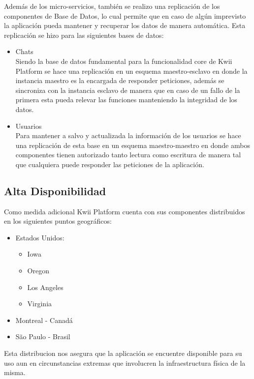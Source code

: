 Además de los micro-servicios, también se realizo una replicación de los componentes de Base de Datos, lo cual permite que en caso de algún imprevisto la aplicación pueda mantener y recuperar los datos de manera automática. 
Esta replicación se hizo para las siguientes bases de datos:
\begin{itemize}
    \item Chats\\
    Siendo la base de datos fundamental para la funcionalidad core de Kwii Platform se hace una replicación en un esquema maestro-esclavo en donde la instancia maestro es la encargada de responder peticiones, además se sincroniza con la instancia esclavo de manera que en caso de un fallo de la primera esta pueda relevar las funciones manteniendo la integridad de los datos.
    \item Usuarios\\
    Para mantener a salvo y actualizada la información de los usuarios se hace una replicación de esta base en un esquema maestro-maestro en donde ambos componentes tienen autorizado tanto lectura como escritura de manera tal que cualquiera puede responder las peticiones de la aplicación.
\end{itemize}

\subsection{Alta Disponibilidad}

Como medida adicional Kwii Platform cuenta con sus componentes distribuidos en los siguientes puntos geográficos:
\begin{itemize}
    \item Estados Unidos:
    \begin{itemize}
        \item Iowa
        \item Oregon
        \item Los Angeles
        \item Virginia
    \end{itemize}
    \item Montreal - Canadá
    \item São Paulo - Brasil
\end{itemize}

\noindent Esta distribucion nos asegura que la aplicación se encuentre disponible para su uso aun en circunstancias extremas que involucren la infraestructura física de la misma.